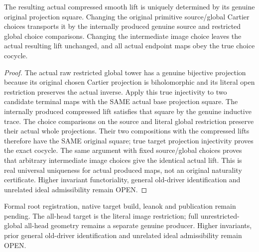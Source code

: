 \begin{theorem}
\label{hir:submersion-compressed-image-trace-unique-choice-cocycle}
\leanok
{}

The resulting actual compressed smooth lift is uniquely determined by its genuine original projection square. Changing the original primitive source/global Cartier choices transports it by the internally produced genuine source and restricted global choice comparisons. Changing the intermediate image choice leaves the actual resulting lift unchanged, and all actual endpoint maps obey the true choice cocycle.
\end{theorem}
\begin{proof}
The actual raw restricted global tower has a genuine bijective projection because its original chosen Cartier projection is biholomorphic and its literal open restriction preserves the actual inverse. Apply this true injectivity to two candidate terminal maps with the SAME actual base projection square. The internally produced compressed lift satisfies that square by the genuine inductive trace. The choice comparisons on the source and literal global restriction preserve their actual whole projections. Their two compositions with the compressed lifts therefore have the SAME original square; true target projection injectivity proves the exact cocycle. The same argument with fixed source/global choices proves that arbitrary intermediate image choices give the identical actual lift. This is real universal uniqueness for actual produced maps, not an original naturality certificate. Higher invariant functoriality, general old-driver identification and unrelated ideal admissibility remain OPEN.
\end{proof}


Formal root registration, native target build, leanok and publication remain pending. The all-head target is the literal image restriction; full unrestricted-global all-head geometry remains a separate genuine producer. Higher invariants, prior general old-driver identification and unrelated ideal admissibility remain OPEN.
